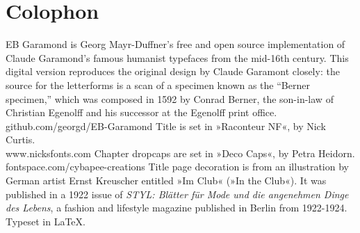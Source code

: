 \documentclass[
a5paper,
BCOR=7mm,
twoside,
DIV=calc,
11pt,
usegeometry,
chapterprefix,
headings=big]{scrbook} %
\begin{document}
\pagestyle{plain}

\renewcommand*\raggedchapter{\centering}





\tableofcontents
\enlargethispage{1.5\baselineskip}
\clearpage








\mainmatter
\pagestyle{headings}
\renewcommand*{\chapterpagestyle}{plain}


























\clearpage
{}
\chapter*{Colophon}
\begin{center}
EB Garamond is Georg Mayr-Duffner's free and open source implementation of Claude Garamond’s famous humanist typefaces from the mid-16th century. This digital version reproduces the original design by Claude Garamont closely: the source for the letterforms is a scan of a specimen known as the \enquote{Berner specimen,} which was composed in 1592 by Conrad Berner, the son-in-law of Christian Egenolff and his successor at the Egenolff print office.  \\github.com/georgd/EB-Garamond
\vfill
Title is set in »Raconteur NF«, by Nick Curtis.\\www.nicksfonts.com
\vfill
Chapter dropcaps are set in »Deco Caps«, by Petra Heidorn.\\fontspace.com/cybapee-creations
\vfill
Title page decoration is from an illustration by German artist Ernst Kreuscher entitled »Im Club« (»In the Club«). It was published in a 1922 issue of \textit{STYL: Blätter für Mode und die angenehmen Dinge des Lebens}, a fashion and lifestyle magazine published in Berlin from 1922-1924.
\vfill
Typeset in \LaTeX{}.
\end{center}
\thispagestyle{empty}
\end{document}
